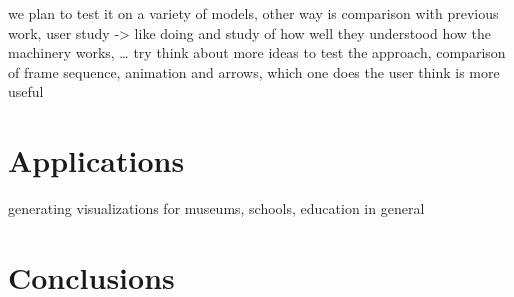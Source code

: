 \documentclass[11pt]{report}
\begin{document}
we plan to test it on a variety of models, other way is comparison with previous work, user study -> like doing and study of how well they understood how the machinery works, … try think about more ideas to test the approach, comparison of frame sequence, animation and arrows, which one does the user think is more useful 

\chapter{Applications}

generating visualizations for museums, schools, education in general

\chapter{Conclusions}






\end{document}
